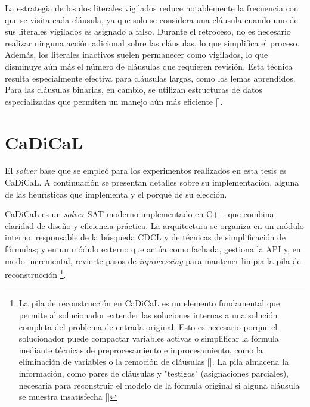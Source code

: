 
La estrategia de los dos literales vigilados reduce notablemente la frecuencia con que se visita cada cláusula, ya que solo se considera una cláusula cuando uno de sus literales vigilados es asignado a falso. Durante el retroceso, no es necesario realizar ninguna acción adicional sobre las cláusulas, lo que simplifica el proceso. Además, los literales inactivos suelen permanecer como vigilados, lo que disminuye aún más el número de cláusulas que requieren revisión. Esta técnica resulta especialmente efectiva para cláusulas largas, como los lemas aprendidos. Para las cláusulas binarias, en cambio, se utilizan estructuras de datos especializadas que permiten un manejo aún más eficiente [\cite{oliveras2009dpll_cdcl}].


\section{CaDiCaL}
\label{sec:cadical}
El \textit{solver} base que se emple\'o para los experimentos realizados en esta tesis es CaDiCaL. A continuaci\'on se presentan detalles sobre su implementaci\'on, alguna de las heur\'isticas que implementa y el porqu\'e de su elecci\'on.

CaDiCaL es un \textit{solver} SAT moderno implementado en C++ que combina claridad de diseño y eficiencia práctica. La arquitectura se organiza en un módulo interno, responsable de la búsqueda CDCL y de técnicas de simplificación de fórmulas; y en un módulo externo que actúa como fachada, gestiona la API y, en modo incremental, revierte pasos de \textit{inprocessing} para mantener limpia la pila de reconstrucción \footnote{La pila de reconstrucción en CaDiCaL es un elemento fundamental que permite al solucionador extender las soluciones internas a una soluci\'on completa del problema de entrada original. Esto es necesario porque el solucionador puede compactar variables activas o simplificar la fórmula mediante técnicas de preprocesamiento e inprocesamiento, como la eliminación de variables o la remoción de cláusulas [\cite{cadical2024}]. La pila almacena la información, como pares de cláusulas y "testigos" (asignaciones parciales), necesaria para reconstruir el modelo de la fórmula original si alguna cláusula se muestra insatisfecha [\cite{cai2022better_heuristics}]}.


